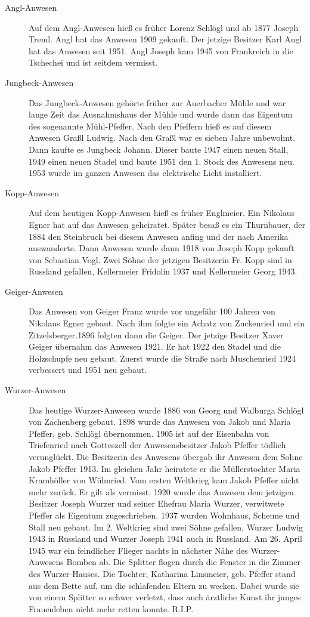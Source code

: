\documentclass{book}
\begin{document}
\begin{description}
\item[Angl-Anwesen] Auf dem Angl-Anwesen hieß es früher Lorenz Schlögl
und ab 1877 Joseph Treml. Angl hat das Anwesen 1909 gekauft. Der jetzige
Besitzer Karl Angl hat das Anwesen seit 1951. Angl Joseph kam 1945 von
Frankreich in die Tschechei und ist seitdem vermisst.

\item[Jungbeck-Anwesen] Das Jungbeck-Anwesen gehörte früher zur Auerbacher
Mühle und war lange Zeit das Ausnahmshaus der Mühle und wurde dann das
Eigentum des sogenannte Mühl-Pfeffer. Nach den Pfeffern hieß es auf
diesem Anwesen Graßl Ludwig. Nach den Graßl war es sieben Jahre
unbewohnt. Dann kaufte es Jungbeck Johann. Dieser baute 1947 einen neuen
Stall, 1949 einen neuen Stadel und baute 1951 den 1. Stock des Anwesens
neu. 1953 wurde im ganzen Anwesen das elektrische Licht installiert.

\item[Kopp-Anwesen] Auf dem heutigen Kopp-Anwesen hieß es früher
Englmeier. Ein Nikolaus Egner hat auf das Anwesen geheiratet. Später
besaß es ein Thurnbauer, der 1884 den Steinbruch bei diesem Anwesen
anfing und der nach Amerika auswanderte. Dann Anwesen wurde dann 1918
von Joseph Kopp gekauft von Sebastian Vogl. Zwei Söhne der jetzigen
Besitzerin Fr. Kopp sind in Russland gefallen, Kellermeier Fridolin 1937
und Kellermeier Georg 1943.

\item[Geiger-Anwesen] Das Anwesen von Geiger Franz wurde vor ungefähr
100 Jahren von Nikolaus Egner gebaut. Nach ihm folgte ein Achatz von
Zuckenried und ein Zitzelsberger.1896 folgten dann die Geiger. Der
jetzige Besitzer Xaver Geiger übernahm das Anwesen 1921. Er hat 1922 den
Stadel und die Holzschupfe neu gebaut. Zuerst wurde die Straße nach
Muschenried 1924 verbessert und 1951 neu gebaut.

\item[Wurzer-Anwesen] Das heutige Wurzer-Anwesen wurde 1886 von Georg
und Walburga Schlögl von Zachenberg gebaut. 1898 wurde das Anwesen von
Jakob und Maria Pfeffer, geb. Schlögl übernommen. 1905 ist auf der
Eisenbahn von Triefenried nach Gotteszell der Anwesensbesitzer Jakob
Pfeffer tödlich verunglückt. Die Besitzerin des Anwesens übergab ihr
Anwesen dem Sohne Jakob Pfeffer 1913. Im gleichen Jahr heiratete er die
Müllerstochter Maria Kramhöller von Wühnried. Vom ersten Weltkrieg kam
Jakob Pfeffer nicht mehr zurück. Er gilt als vermisst. 1920 wurde das
Anwesen dem jetzigen Besitzer Joseph Wurzer und seiner Ehefrau Maria
Wurzer, verwitwete Pfeffer als Eigentum zugeschrieben. 1937 wurden
Wohnhaus, Scheune und Stall neu gebaut. Im 2. Weltkrieg sind zwei Söhne
gefallen, Wurzer Ludwig 1943 in Russland und Wurzer Joseph 1941 auch in
Russland. Am 26. April 1945 war ein feindlicher Flieger nachts in
nächster Nähe des Wurzer-Anwesens Bomben ab. Die Splitter flogen durch
die Fenster in die Zimmer des Wurzer-Hauses. Die Tochter, Katharina
Linsmeier, geb. Pfeffer stand aus dem Bette auf‚ um die schlafenden
Eltern zu wecken. Dabei wurde sie von einem Splitter so schwer verletzt,
dass auch ärztliche Kunst ihr junges Frauenleben nicht mehr retten
konnte. R.I.P.
\end{description}
\end{document}
